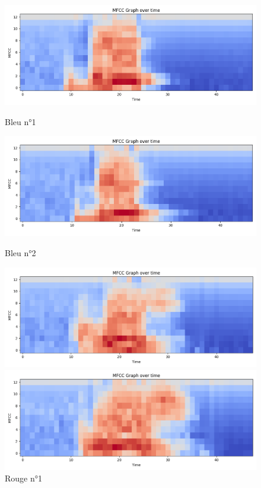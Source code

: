 \documentclass[a4paper,11pt]{article}
\begin{document}
{\captionsetup{skip=0pt}
\begin{figure}[H]
\centering
\begin{minipage}{0.48\textwidth}
\centering
\includegraphics[scale=0.37]{images/bleu1.png}
\caption*{Bleu n°1}
\end{minipage}
\hfill
\begin{minipage}{0.48\textwidth}
\centering
\includegraphics[scale=0.37]{images/bleu2.png}
\caption*{Bleu n°2}
\end{minipage}
\vspace{0.3cm}
\vfill
\begin{minipage}{0.48\textwidth}
\centering
\includegraphics[scale=0.37]{images/rouge1.png}
\caption*{Rouge n°1}
\end{minipage}
\hfill
\begin{minipage}{0.48\textwidth}
\centering
\includegraphics[scale=0.37]{images/rouge2.png}

\end{minipage}
\end{figure}}
\end{document}
